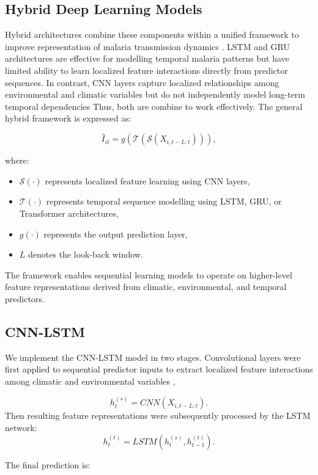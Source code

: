 \subsection{Hybrid Deep Learning Models}
\label{sec:hybrid_models}

 Hybrid architectures combine these components within a unified framework to improve representation of malaria transmission dynamics \cite{Srivastava2025}. LSTM and GRU architectures are effective for modelling temporal malaria patterns but have limited ability to learn localized feature interactions directly from predictor sequences. In contrast, CNN layers capture localized relationships among environmental and climatic variables but do not independently model long-term temporal dependencies Thus, both are combine to work effectively.
The general hybrid framework is expressed as:

\[
\hat{I}_{it} = g\left( \mathcal{T} \left( \mathcal{S}(X_{i,t-L:t}) \right) \right),
\]
	
where:
\begin{itemize}
	\item $\mathcal{S}(\cdot)$ represents localized feature learning using CNN layers,
	\item $\mathcal{T}(\cdot)$ represents temporal sequence modelling using LSTM, GRU, or Transformer architectures,
	\item $g(\cdot)$ represents the output prediction layer,
	\item $L$ denotes the look-back window.
\end{itemize}

The framework enables sequential learning models to operate on higher-level feature representations derived from climatic, environmental, and temporal predictors.


	\subsection{CNN-LSTM}
	
	We implement the CNN-LSTM model in two stages. Convolutional layers were first applied to sequential predictor inputs to extract localized feature interactions among climatic and environmental variables \cite{Srivastava2025},
	
	\[
	h^{(s)}_t = CNN(X_{i,t-L:t}).
	\]
	Then resulting feature representations were subsequently processed by the LSTM network:	
	\[
	h^{(t)}_t = LSTM(h^{(s)}_t, h^{(t)}_{t-1}).
	\]
	
	The final prediction is:
	
